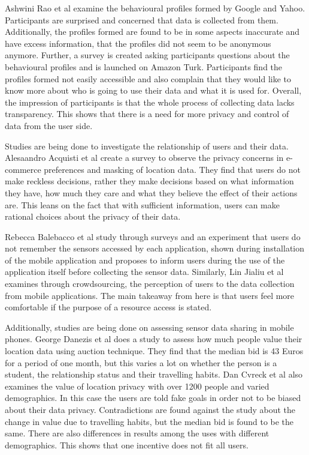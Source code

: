 Ashwini Rao et al \cite{rao2015they} examine the behavioural profiles formed by Google and Yahoo. Participants are surprised and concerned that data is collected from them. Additionally, the profiles formed are found to be in some aspects inaccurate and have excess information, that the profiles did not seem to be anonymous anymore. Further, a survey is created asking participants questions about the behavioural profiles and is launched on Amazon Turk. Participants find the profiles formed not easily accessible and also complain that they would like to know more about who is going to use their data and what it is used for. Overall, the impression of participants is that the whole process of collecting data lacks transparency. This shows that there is a need for more privacy and control of data from the user side.

Studies are being done to investigate the relationship of users and their data. Alesaandro Acquisti et al \cite{acquisti2005privacy} create a survey to observe the privacy concerns in e-commerce preferences and masking of location data. They find that users do not make reckless decisions, rather they make decisions based on what information they have, how much they care and what they believe the effect of their actions are. This leans on the fact that with sufficient information, users can make rational choices about the privacy of their data. 

Rebecca Balebacco et al \cite{balebako2015impact} study through surveys and an experiment that users do not remember the sensors accessed by each application, shown during installation of the mobile application and proposes to inform users during the use of the application itself before collecting the sensor data. Similarly, Lin Jialiu et al \cite{lin2012expectation} examines through crowdsourcing, the perception of users to the data collection from mobile applications. The main takeaway from here is that users feel more comfortable if the purpose of a resource access is stated.

Additionally, studies are being done on assessing sensor data sharing in mobile phones. George Danezis et al \cite{danezis2005much} does a study to assess how much people value their location data using auction technique. They find that the median bid is 43 Euros for a period of one month, but this varies a lot on whether the person is a student, the relationship status and their travelling habits.  Dan Cvreck et al \cite{cvrcek2006study} also examines the value of location privacy with over 1200 people and varied demographics. In this case the users are told fake goals in order not to be biased about their data privacy. Contradictions are found against the study \cite{danezis2005much} about the change in value due to travelling habits, but the median bid is found to be the same. There are also differences in results among the uses with different demographics. This shows that one incentive does not fit all users.

